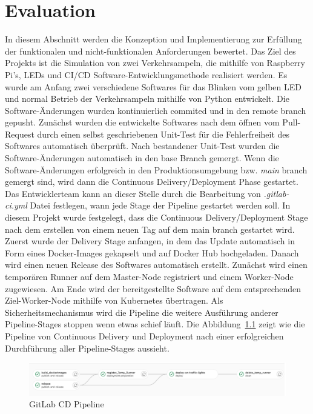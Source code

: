 \chapter{Evaluation}

In diesem Abschnitt werden die Konzeption und Implementierung zur Erfüllung der funktionalen und nicht-funktionalen Anforderungen bewertet. Das Ziel des Projekts ist die Simulation von zwei Verkehrsampeln, die mithilfe von Raspberry Pi’s, LEDs und CI/CD Software-Entwicklungsmethode realisiert werden. 
\newline\newline
Es wurde am Anfang zwei verschiedene Softwares für das Blinken vom gelben LED und normal Betrieb der Verkehrsampeln mithilfe von Python entwickelt. Die Software-Änderungen wurden kontinuierlich commited und in den remote branch gepusht. Zunächst wurden die entwickelte Softwares nach dem öffnen vom Pull-Request durch einen selbst geschriebenen Unit-Test für die Fehlerfreiheit des Softwares automatisch überprüft. Nach bestandener Unit-Test wurden die Software-Änderungen automatisch in den base Branch gemergt. Wenn die Software-Änderungen erfolgreich in den Produktionsumgebung bzw. \textit{main} branch gemergt sind, wird dann die Continuous Delivery/Deployment Phase gestartet. Das Entwicklerteam kann an dieser Stelle durch die Bearbeitung von \textit{.gitlab-ci.yml} Datei festlegen, wann jede Stage der Pipeline gestartet werden soll. In diesem Projekt wurde festgelegt, dass die Continuous Delivery/Deployment Stage nach dem erstellen von einem neuen Tag auf dem main branch gestartet wird. Zuerst wurde der Delivery Stage anfangen, in dem das Update automatisch in Form eines Docker-Images gekapselt und auf Docker Hub hochgeladen. Danach wird einen neuen Release des Softwares automatisch erstellt. Zunächst wird einen temporären Runner auf dem Master-Node registriert und einem Worker-Node zugewiesen. Am Ende wird der bereitgestellte Software auf dem entsprechenden Ziel-Worker-Node mithilfe von Kubernetes übertragen.
\newline\newline
Als Sicherheitsmechanismus wird die Pipeline die weitere Ausführung anderer Pipeline-Stages stoppen wenn etwas schief läuft. Die Abbildung~\ref{fig:GitLabCDPipeline} zeigt wie die Pipeline von Continuous Delivery und Deployment nach einer erfolgreichen Durchführung aller Pipeline-Stages aussieht.

\begin{figure}[!htbp]%
	\centering
	\includegraphics[width=1.0\textwidth]{Graphics/GitLab-pipeline.png}
	\caption{GitLab CD Pipeline}
	\label{fig:GitLabCDPipeline}
\end{figure}
 
